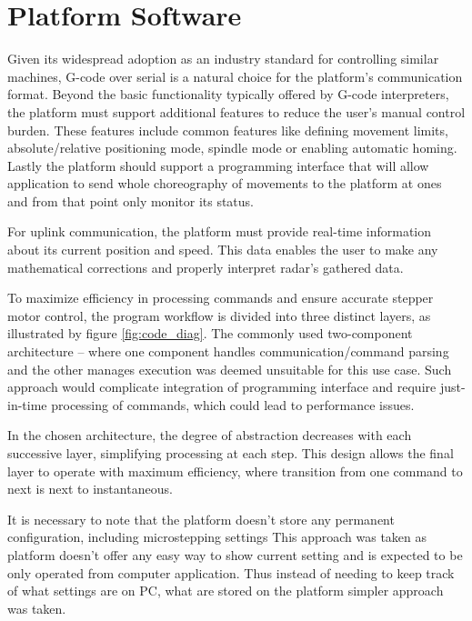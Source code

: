 \section{Platform Software}

Given its widespread adoption as an industry standard for controlling similar machines, G-code over serial is a natural choice for the platform's communication format.
Beyond the basic functionality typically offered by G-code interpreters, the platform must support additional features to reduce the user's manual control burden.
These features include common features like defining movement limits, absolute/relative positioning mode, spindle mode or enabling automatic homing.
Lastly the platform should support a programming interface that will allow application to send whole choreography of movements to the platform at ones and from that point only monitor its status.

For uplink communication, the platform must provide real-time information about its current position and speed.
This data enables the user to make any mathematical corrections and properly interpret radar's gathered data.

To maximize efficiency in processing commands and ensure accurate stepper motor control, the program workflow is divided into three distinct layers, as illustrated by figure \ref{fig:code_diag}.
The commonly used two-component architecture -- where one component handles communication/command parsing and the other manages execution was deemed unsuitable for this use case.
Such approach would complicate integration of programming interface and require just-in-time processing of commands, which could lead to performance issues.

In the chosen architecture, the degree of abstraction decreases with each successive layer, simplifying processing at each step.
This design allows the final layer to operate with maximum efficiency, where transition from one command to next is next to instantaneous.

It is necessary to note that the platform doesn't store any permanent configuration, including microstepping settings
This approach was taken as platform doesn't offer any easy way to show current setting and is expected to be only operated from computer application.
Thus instead of needing to keep track of what settings are on PC, what are stored on the platform simpler approach was taken.


